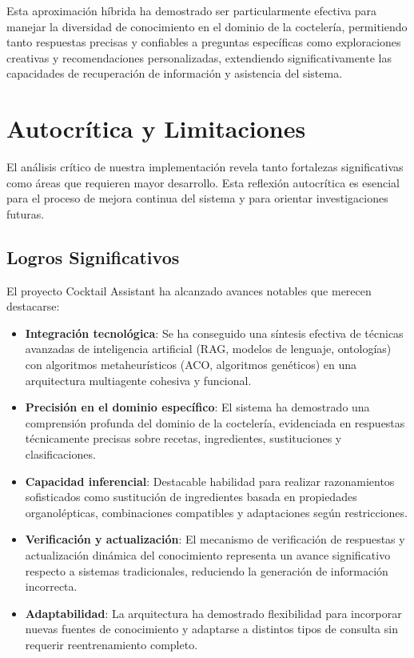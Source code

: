 \documentclass[runningheads]{llncs}
\begin{document}
Esta aproximación híbrida ha demostrado ser particularmente efectiva para manejar la diversidad de conocimiento en el dominio de la coctelería, permitiendo tanto respuestas precisas y confiables a preguntas específicas como exploraciones creativas y recomendaciones personalizadas, extendiendo significativamente las capacidades de recuperación de información y asistencia del sistema.



\section{Autocrítica y Limitaciones}

El análisis crítico de nuestra implementación revela tanto fortalezas significativas como áreas que requieren mayor desarrollo. Esta reflexión autocrítica es esencial para el proceso de mejora continua del sistema y para orientar investigaciones futuras.

\subsection{Logros Significativos}

El proyecto Cocktail Assistant ha alcanzado avances notables que merecen destacarse:

\begin{itemize}
  \item \textbf{Integración tecnológica}: Se ha conseguido una síntesis efectiva de técnicas avanzadas de inteligencia artificial (RAG, modelos de lenguaje, ontologías) con algoritmos metaheurísticos (ACO, algoritmos genéticos) en una arquitectura multiagente cohesiva y funcional.
  
  \item \textbf{Precisión en el dominio específico}: El sistema ha demostrado una comprensión profunda del dominio de la coctelería, evidenciada en respuestas técnicamente precisas sobre recetas, ingredientes, sustituciones y clasificaciones.
  
  \item \textbf{Capacidad inferencial}: Destacable habilidad para realizar razonamientos sofisticados como sustitución de ingredientes basada en propiedades organolépticas, combinaciones compatibles y adaptaciones según restricciones.
  
  \item \textbf{Verificación y actualización}: El mecanismo de verificación de respuestas y actualización dinámica del conocimiento representa un avance significativo respecto a sistemas tradicionales, reduciendo la generación de información incorrecta.
  
  \item \textbf{Adaptabilidad}: La arquitectura ha demostrado flexibilidad para incorporar nuevas fuentes de conocimiento y adaptarse a distintos tipos de consulta sin requerir reentrenamiento completo.
\end{itemize}
\end{document}
